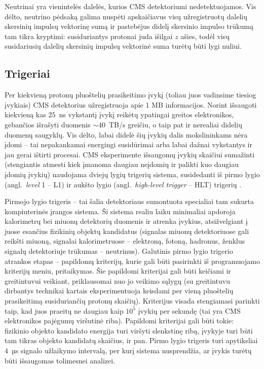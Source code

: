 \documentclass[a4paper, 12pt, oneside]{article}
\begin{document}
Neutrinai yra vienintelės dalelės, kurios CMS detektoriumi nedetektuojamos.
Vis dėlto, neutrino pėdsaką galima nuspėti apskaičiavus visų užregistruotų dalelių skersinių impulsų vektorinę sumą
ir pastebėjus didelį skersinio impulso trūkumą tam tikra kryptimi: susiduriantys protonai juda išilgai $z$ ašies,
todėl visų susidariusių dalelių skersinių impulsų vektorinė suma turėtų būti lygi nuliui.

\subsection{Trigeriai}
Per kiekvieną protonų pluoštelių prasikeitimo įvykį (toliau juos vadinsime tiesiog įvykiais) CMS detektorius
užregistruoja apie $1$ MB informacijos.
Norint išsaugoti kiekvieną kas $25$~ns vykstantį įvykį reikėtų ypatingai greitos elektronikos, gebančios išrašyti
duomenis $\sim\!\!40$~TB/s greičiu, o taip pat ir nerealiai didelių duomenų saugyklų.
Vis dėlto, labai didelė šių įvykių dalis mokslininkams nėra įdomi -- tai nepakankamai energingi susidūrimai
arba labai dažnai vykstantys ir jau gerai ištirti procesai.
CMS eksperimente išsaugomų įvykių skaičiui sumažinti (stengiantis atmesti kiek įmanoma daugiau neįdomių ir palikti
kuo daugiau įdomių įvykių) naudojama dviejų lygių trigerių sistema, susidedanti iš pirmo lygio
(angl.\ \textit{level} 1 -- L1) ir aukšto lygio (angl.\ \textit{high-level trigger} -- HLT) trigerių \cite{CMStrig}.

Pirmojo lygio trigeris -- tai šalia detektoriaus sumontuota specialiai tam sukurta kompiuterinės įrangos sistema.
Ši sistema realiu laiku minimaliai apdoroja kalorimetrų bei miuonų detektorių duomenis ir atrenka įvykius, atsižvelgiant
į juose esančius fizikinių objektų kandidatus (signalas miuonų detektoriuose gali reikšti miuoną, signalai kalorimetruose --
elektroną, fotoną, hadronus, ženklus signalų detektoriuje trūkumas -- neutrinus).
Galutinis pirmo lygio trigerio atrankos etapas -- papildomų kriterijų, kurie gali būti pasirinkti iš programuojamo
kriterijų meniu, pritaikymas.
Šie papildomi kriterijai gali būti keičiami ir greitintuvui veikiant, priklausomai nuo jo veikimo sąlygų
(su greitintuvu dirbantys technikai kartais eksperimentuoja keisdami per vieną pluoštelių prasikeitimą susiduriančių protonų skaičių).
Kriterijus visada stengiamasi parinkti taip, kad juos praeitų ne daugiau kaip $10^5$ įvykių per sekundę
(tai yra CMS elektronikos pajėgumų viršutinė riba).
Papildomi kriterijai gali būti tokie: fizikinio objekto kandidato energija turi viršyti slenkstinę ribą, įvykyje turi
būti tam tikras objekto kandidatų skaičius, ir pan.
Pirmo lygio trigeris turi apytiksliai $4$~µs signalo užlaikymo intervalą, per kurį sistema nusprendžia, ar įvykis turėtų būti
išsaugomas tolimesnei analizei. 
\end{document}
